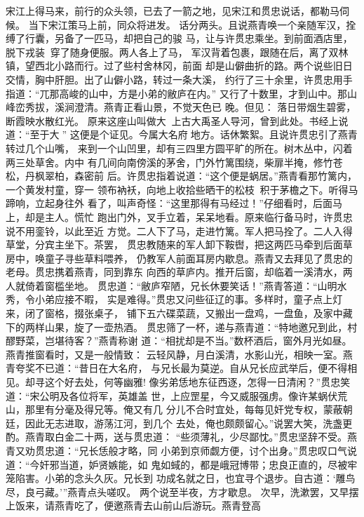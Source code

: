 宋江上得马来，前行的众头领，已去了一箭之地，见宋江和贯忠说话，都勒马伺候。
当下宋江策马上前，同众将进发。
话分两头。且说燕青唤一个亲随军汉，拴缚了行囊，另备了一匹马，却把自己的骏
马，让与许贯忠乘坐。到前面酒店里，脱下戎装，穿了随身便服。两人各上了马，
军汉背着包裹，跟随在后，离了双林镇，望西北小路而行。过了些村舍林冈，前面
却是山僻曲折的路。两个说些旧日交情，胸中肝胆。出了山僻小路，转过一条大溪，
约行了三十余里，许贯忠用手指道：“兀那高峻的山中，方是小弟的敝庐在内。”
又行了十数里，才到山中。那山峰峦秀拔，溪涧澄清。燕青正看山景，不觉天色已
晚。但见：
落日带烟生碧雾，断霞映水散红光。
原来这座山叫做大，上古大禹圣人导河，曾到此处。书经上说道：“至于大”
这便是个证见。今属大名府地方。话休繁絮。且说许贯忠引了燕青转过几个山嘴，
来到一个山凹里，却有三四里方圆平旷的所在。树木丛中，闪着两三处草舍。内中
有几间向南傍溪的茅舍，门外竹篱围绕，柴扉半掩，修竹苍松，丹枫翠柏，森密前
后。许贯忠指着说道：“这个便是蜗居。”燕青看那竹篱内，一个黄发村童，穿一
领布衲袄，向地上收拾些晒干的松枝积于茅檐之下。听得马蹄响，立起身往外
看了，叫声奇怪：“这里那得有马经过！”仔细看时，后面马上，却是主人。慌忙
跑出门外，叉手立着，呆呆地看。原来临行备马时，许贯忠说不用銮铃，以此至近
方觉。二人下了马，走进竹篱。军人把马拴了。二人入得草堂，分宾主坐下。茶罢，
贯忠教随来的军人卸下鞍辔，把这两匹马牵到后面草房中，唤童子寻些草料喂养，
仍教军人前面耳房内歇息。燕青又去拜见了贯忠的老母。贯忠携着燕青，同到靠东
向西的草庐内。推开后窗，却临着一溪清水，两人就倚着窗槛坐地。
贯忠道：“敝庐窄陋，兄长休要笑话！”燕青答道：“山明水秀，令小弟应接不暇，
实是难得。”贯忠又问些征辽的事。多样时，童子点上灯来，闭了窗格，掇张桌子，
铺下五六碟菜蔬，又搬出一盘鸡，一盘鱼，及家中藏下的两样山果，旋了一壶热酒。
贯忠筛了一杯，递与燕青道：“特地邀兄到此，村醪野菜，岂堪待客？”燕青称谢
道：“相扰却是不当。”数杯酒后，窗外月光如昼。燕青推窗看时，又是一般情致：
云轻风静，月白溪清，水影山光，相映一室。燕青夸奖不已道：“昔日在大名府，
与兄长最为莫逆。自从兄长应武举后，便不得相见。却寻这个好去处，何等幽雅!
像劣弟恁地东征西逐，怎得一日清闲？”贯忠笑道：“宋公明及各位将军，英雄盖
世，上应罡星，今又威服强虏。像许某蜗伏荒山，那里有分毫及得兄等。俺又有几
分儿不合时宜处，每每见奸党专权，蒙蔽朝廷，因此无志进取，游荡江河，到几个
去处，俺也颇颇留心。”说罢大笑，洗盏更酌。燕青取白金二十两，送与贯忠道：
“些须薄礼，少尽鄙忱。”贯忠坚辞不受。燕青又劝贯忠道：“兄长恁般才略，同
小弟到京师觑方便，讨个出身。”贯忠叹口气说道：“今奸邪当道，妒贤嫉能，如
鬼如蜮的，都是峨冠博带；忠良正直的，尽被牢笼陷害。小弟的念头久灰。兄长到
功成名就之日，也宜寻个退步。自古道：‘雕鸟尽，良弓藏。’”燕青点头嗟叹。
两个说至半夜，方才歇息。
次早，洗漱罢，又早摆上饭来，请燕青吃了，便邀燕青去山前山后游玩。燕青登高
